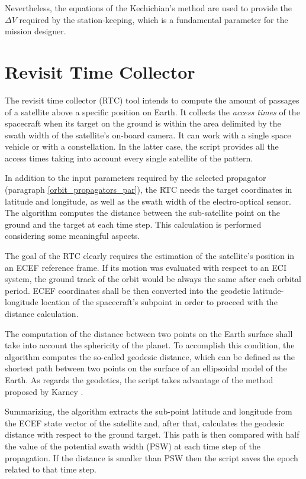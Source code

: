Nevertheless, the equations of the Kechichian's method are used to provide the $\Delta V$ required by the station-keeping, which is a fundamental parameter for the mission designer.



\section{Revisit Time Collector} \label{revisit_time_collector_par}
The revisit time collector (RTC) tool intends to compute the amount of passages of a satellite above a specific position on Earth.
It collects the \textit{access times} of the spacecraft when its target on the ground is within the area delimited by the swath width of the satellite's on-board camera. 
It can work with a single space vehicle or with a constellation. 
In the latter case, the script provides all the access times taking into account every single satellite of the pattern. 

In addition to the input parameters required by the selected propagator (paragraph \ref{orbit_propagators_par}), the RTC needs the target coordinates in latitude and longitude, as well as the swath width of the electro-optical sensor.
The algorithm computes the distance between the sub-satellite point on the ground and the target at each time step.
This calculation is performed considering some meaningful aspects.

The goal of the RTC clearly requires the estimation of the satellite's position in an ECEF reference frame.
If its motion was evaluated with respect to an ECI system, the ground track of the orbit would be always the same after each orbital period.
ECEF coordinates shall be then converted into the geodetic latitude-longitude location of the spacecraft's subpoint in order to proceed with the distance calculation.

The computation of the distance between two points on the Earth surface shall take into account the sphericity of the planet.
To accomplish this condition, the algorithm computes the so-called geodesic distance, which can be defined as the shortest path between two points on the surface of an ellipsoidal model of the Earth. 
As regards the geodetics, the script takes advantage of the method proposed by Karney \cite{karney2013algorithms}.

Summarizing, the algorithm extracts the sub-point latitude and longitude from the ECEF state vector of the satellite and, after that, calculates the geodesic distance with respect to the ground target.
This path is then compared with half the value of the potential swath width (PSW) at each time step of the propagation.
If the distance is smaller than PSW then the script saves the epoch related to that time step.

